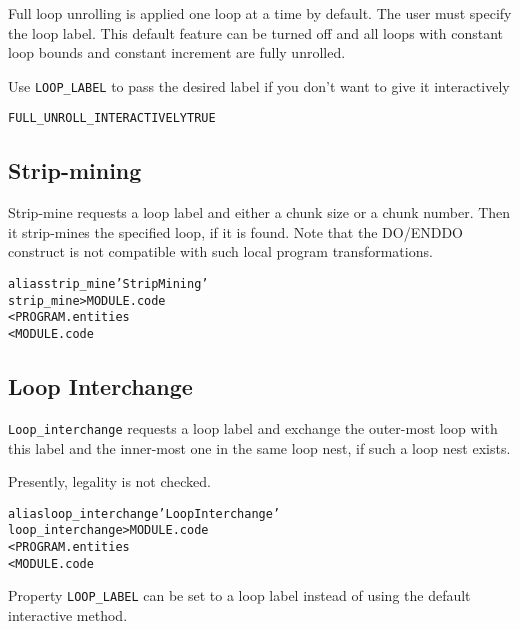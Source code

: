 \documentclass[a4paper]{report}
\newenvironment{PipsProp}{\begin{alltt}}{\end{alltt}}
\newenvironment{PipsMake}{\begin{alltt}}{\end{alltt}}
\begin{document}
Full loop unrolling is applied one loop at a time by default. The user
must specify the loop label. This default feature can be turned off
and all loops with constant loop bounds and constant increment are
fully unrolled.

Use \lstinline|LOOP_LABEL| to pass the desired label if you don't want to give it interactively

\begin{PipsProp}
FULL_UNROLL_INTERACTIVELY TRUE
\end{PipsProp}



\subsection{Strip-mining}
\label{subsection-strip-mining}

Strip-mine requests a loop label and either a chunk size or a chunk number.
Then it strip-mines the specified loop, if it is found. Note that the
DO/ENDDO construct is not compatible with such local program transformations.

\begin{PipsMake}
alias strip_mine 'Strip Mining'
strip_mine                          > MODULE.code
        < PROGRAM.entities
        < MODULE.code
\end{PipsMake}

\subsection{Loop Interchange}
\label{subsection-loop-interchange}

\verb/Loop_interchange/ requests a loop label and exchange the outer-most loop
with this label and the inner-most one in the same loop nest, if such a
loop nest exists.

Presently, legality is not checked.

\begin{PipsMake}
alias loop_interchange 'Loop Interchange'
loop_interchange                            > MODULE.code
        < PROGRAM.entities
        < MODULE.code
\end{PipsMake}

Property \lstinline|LOOP_LABEL| can be set to a loop label instead of using the default interactive method.
\end{document}
